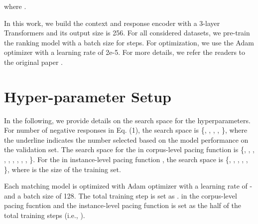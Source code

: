 \documentclass[11pt,a4paper]{article}
\begin{document}
where .

In this work, we build the context and response encoder with a 3-layer Transformers and its output size is 256. For all considered datasets, we pre-train the ranking model with a batch size  for  steps. For optimization, we use the Adam optimizer \cite{DBLP:journals/corr/KingmaB14} with a learning rate of 2e-5. For more details, we refer the readers to the original paper \cite{DBLP:conf/emnlp/KarpukhinOMLWEC20}. 


\section{Hyper-parameter Setup}
In the following, we provide details on the search space for the hyperparameters. For number of negative responses  in Eq. (1), the search space is \{, \underline{}, , , \}, where the underline indicates the number selected based on the model performance on the validation set. The search space for the  in corpus-level pacing function  is \{, ,  \underline{}, , , , , , , \}. For the  in instance-level pacing function , the search space is \{,  , \underline{}, , , \}, where  is the size of the training set. 

Each matching model is optimized with Adam optimizer \cite{DBLP:journals/corr/KingmaB14} with a learning rate of - and a batch size of 128. The total training step is set as .  in the corpus-level pacing fucntion  and the instance-level pacing function  is set as the half of the total training steps (i.e., ).
\end{document}
